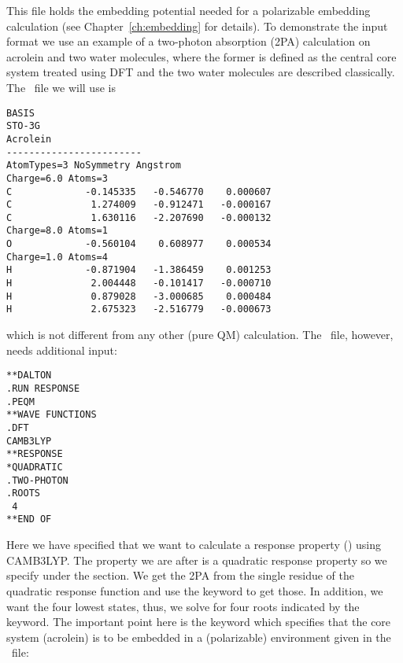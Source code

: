 This file holds the embedding potential needed for a polarizable embedding
calculation (see Chapter~\ref{ch:embedding} for details). To demonstrate the
input format we use an example of a two-photon absorption (2PA) calculation
on acrolein and two water molecules, where the former is defined as the central core system treated using DFT and the two water molecules are described classically. The \molinp\ file we will use is
\begin{verbatim}
BASIS
STO-3G
Acrolein
------------------------
AtomTypes=3 NoSymmetry Angstrom
Charge=6.0 Atoms=3
C             -0.145335   -0.546770    0.000607
C              1.274009   -0.912471   -0.000167
C              1.630116   -2.207690   -0.000132
Charge=8.0 Atoms=1
O             -0.560104    0.608977    0.000534
Charge=1.0 Atoms=4
H             -0.871904   -1.386459    0.001253
H              2.004448   -0.101417   -0.000710
H              0.879028   -3.000685    0.000484
H              2.675323   -2.516779   -0.000673
\end{verbatim}
which is not different from any other (pure QM) calculation. The \dalinp\ file, however, needs additional input:
\begin{verbatim}
**DALTON
.RUN RESPONSE
.PEQM
**WAVE FUNCTIONS
.DFT
CAMB3LYP
**RESPONSE
*QUADRATIC
.TWO-PHOTON
.ROOTS
 4
**END OF
\end{verbatim}
Here we have specified that we want to calculate a response property 
() using CAMB3LYP. The property we are after is a quadratic 
response property so we specify  under the  
section. We get the 2PA from the single residue of the quadratic response 
function and use the  keyword to get those. In addition, we 
want the four lowest states, thus, we solve for four roots indicated by the 
 keyword. The important point here is the  keyword which 
specifies that the core system (acrolein) is to be embedded in a (polarizable) environment given in the \potinp\ file:
